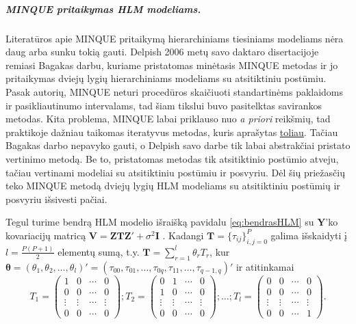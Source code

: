 \documentclass[12pt,a4paper]{article}
\begin{document}
\subparagraph{MINQUE pritaikymas HLM modeliams.} Literatūros apie MINQUE pritaikymą hierarchiniams tiesiniams modeliams nėra daug arba sunku tokią gauti. Delpish\cite{delpish} 2006 metų savo daktaro disertacijoje remiasi Bagakas\cite{bagaka} darbu, kuriame pristatomas minėtasis MINQUE metodas ir jo pritaikymas dviejų lygių hierarchiniams modeliams su atsitiktiniu postūmiu. Pasak autorių, MINQUE neturi procedūros skaičiuoti standartinėms paklaidoms ir pasikliautinumo intervalams, tad šiam tikslui buvo pasitelktas savirankos metodas. Kita problema, MINQUE labai priklauso nuo \textit{a priori} reikšmių, tad praktikoje dažniau taikomas iteratyvus metodas, kuris aprašytas \hyperlink{iminque}{toliau}. Tačiau Bagakas darbo nepavyko gauti, o Delpish savo darbe tik labai abstrakčiai pristato vertinimo metodą. Be to, pristatomas metodas tik atsitiktinio postūmio atveju, tačiau vertinami modeliai su atsitiktiniu postūmiu ir posvyriu. Dėl šių priežasčių teko MINQUE metodą dviejų lygių HLM modeliams su atsitiktiniu postūmių ir posvyriu išsivesti pačiai.

Tegul turime bendrą HLM modelio išraišką pavidalu \ref{eq:bendrasHLM} su $\mathbf{Y}$'ko kovariacijų matricą $\mathbf{V}=\mathbf{ZTZ'}+\sigma^2\mathbf{I}$ . Kadangi $\mathbf{T}=\{\tau_{ij}\}^P_{i,j=0}$ galima išskaidyti į $l=\frac{P(P+1)}{2}$ elementų sumą, t.y.
$\mathbf{T}=\sum^l_{r=1}\theta_rT_r$, kur $\boldsymbol{\theta} = (\theta_1,\theta_2,\dots,\theta_l)'=(\tau_{00}, \tau_{01}, \dots, \tau_{0q}, \tau_{11},\dots, \tau_{q-1,q})'$ ir atitinkamai
\small
\[
T_1=
\begin{pmatrix}
1&0&\cdots&0 \\
0&0&\cdots&0 \\
\vdots&\vdots& \cdots &\vdots \\
0&0&\cdots&0
\end{pmatrix};
T_2=
\begin{pmatrix}
0&1&\cdots&0 \\
1&0&\cdots&0 \\
\vdots&\vdots& \cdots &\vdots \\
0&0&\cdots&0
\end{pmatrix};
\dots;
T_l=
\begin{pmatrix}
0&0&\cdots&0 \\
0&0&\cdots&0 \\
\vdots&\vdots& \cdots &\vdots \\
0&0&\cdots&1
\end{pmatrix}.
\]
\end{document}

